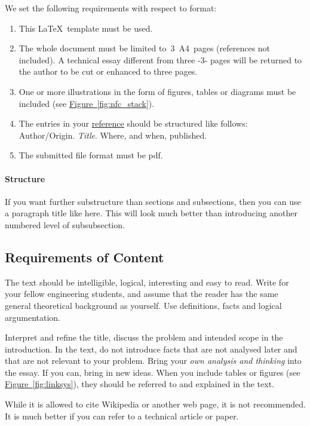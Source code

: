 \documentclass[a4paper,11pt]{article}
\begin{document}
We set the following requirements with respect to format:
\begin{enumerate}
	\item This \LaTeX\ template must be used.
	\item The whole document must be limited to~3~A4~pages (references not included).  A technical essay different from three -3- pages will be returned to the author
to be cut or enhanced to three pages.
	\item One or more illustrations in the form of figures, tables or diagrams must be included (see \hyperref[fig:nfc_stack]{Figure~\ref*{fig:nfc_stack}}).
	\item The entries in your \hyperref[sec:references]{reference} should be structured like follows:
	Author/Origin. \textit{Title}. Where, and when, published.
	\item The submitted file format must be pdf.
\end{enumerate}


\paragraph{Structure}  If you want  further substructure than sections and subsections, then you can use
a paragraph title like here.  This will look much better than introducing another numbered level of subsubsection.

\subsection{Requirements of Content}
 The text should be intelligible, logical, interesting and easy to read. Write for
your fellow engineering students, and assume that the reader has the same general theoretical
background as yourself. Use definitions, facts and logical argumentation. 

Interpret and refine the title, discuss the problem and intended scope in the
introduction. In the text, do not introduce facts that are not analysed later and
that are not relevant to your problem. Bring your \emph{own analysis and thinking} into
the essay. If you can, bring in new ideas. When you include tables or figures (see \hyperref[fig:linksys]{Figure~\ref*{fig:linksys}}), 
they should be referred to and explained in the text.

While it is allowed to cite Wikipedia or another web page, 
it is not recommended.
It is much better if you can refer to a technical article or paper.
\end{document}
